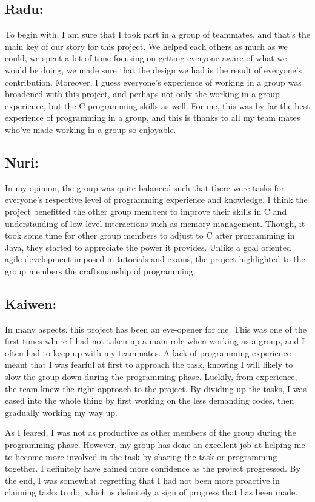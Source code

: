 \documentclass[11pt,a4paper]{article}
\begin{document}
\subsection{Radu:}
To begin with, I am sure that I took part in a group of teammates, and that's the main key of our story for this project. We helped each others as much as we could, we spent a lot of time focusing on getting everyone aware of what we would be doing, we made sure that the design we had is the result of everyone's contribution. Moreover, I guess everyone’s experience of working in a group was broadened with this project, and perhaps not only the working in a group experience, but the C programming skills as well. For me, this was by far the best experience of programming in a group, and this is thanks to all my team mates who've made working in a group so enjoyable.

\subsection{Nuri:}
In my opinion, the group was quite balanced such that there were tasks for everyone’s respective level of programming experience and knowledge. I think the project benefitted the other group members to improve their skills in C and understanding of low level interactions such as memory management. Though, it took some time for other group members to adjust to C after programming in Java, they started to appreciate the power it provides. Unlike a goal oriented agile development imposed in tutorials and exams, the project highlighted to the group members the craftsmanship of programming.


\subsection{Kaiwen:}
In many aspects, this project has been an eye-opener for me. This was one of the first times where I had not taken up a main role when working as a group, and I often had to keep up with my teammates. A lack of programming experience meant that I was fearful at first to approach the task, knowing I will likely to slow the group down during the programming phase. Luckily, from experience, the team knew the right approach to the project. By dividing up the tasks, I was eased into the whole thing by first working on the less demanding codes, then gradually working my way up.

As I feared, I was not as productive as other members of the group during the programming phase. However, my group has done an excellent job at helping me to become more involved in the task by sharing the task or programming together. I definitely have gained more confidence as the project progressed. By the end, I was somewhat regretting that I had not been more proactive in claiming tasks to do, which is definitely a sign of progress that has been made.
\end{document}
